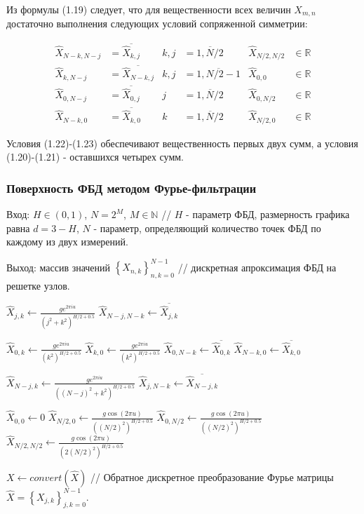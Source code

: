 Из формулы (1.19) следует, что для вещественности всех величин $X_{m,n}$ достаточно выполнения следующих условий сопряженной симметрии:

\begin{align}
	\hat{X}_{N-k,N-j} &= \overline{\hat{X}_{k,j}} &k,j &= \overline{1,N/2} &\hat{X}_{N/2,N/2} & \in \mathbb{R}\\
	\hat{X}_{k,N-j} &= \overline{\hat{X}_{N-k,j}} &k,j &= \overline{1,N/2-1} &\hat{X}_{0,0} & \in \mathbb{R}\\
	\hat{X}_{0,N-j} &= \overline{\hat{X}_{0,j}} &j &= \overline{1,N/2} &\hat{X}_{0,N/2} & \in \mathbb{R}\\
	\hat{X}_{N-k,0} &= \overline{\hat{X}_{k,0}} &k &= \overline{1,N/2} &\hat{X}_{N/2,0} & \in \mathbb{R}
\end{align}

Условия (1.22)-(1.23) обеспечивают вещественность первых двух сумм, а условия (1.20)-(1.21) - оставшихся четырех сумм.

\subsubsection{Поверхность ФБД методом Фурье-фильтрации}

Вход: $H \in (0,1)$, $N=2^M$, $M \in \mathbb{N}$ // $H$ - параметр ФБД, размерность графика равна $d = 3 - H$, $N$ - параметр, определяющий количество точек ФБД по каждому из двух измерений.

Выход: массив значений $\left\{X_{n,k}\right\}_{n,k=0}^{N-1}$ // дискретная апроксимация ФБД на решетке узлов.

\begin{algorithmic}[1]
	\State $\hat{X}_{j,k} \gets \frac{ge^{2\pi iu}}{(j^2+k^2)^{H/2+0.5}}$
	\State$\hat{X}_{N-j,N-k} \gets \overline{\hat{X}_{j,k}}$
	\EndFor
	
	\State $\hat{X}_{0,k} \gets \frac{ge^{2\pi iu}}{(k^2)^{H/2+0.5}}$
	\State $\hat{X}_{k,0} \gets \frac{ge^{2\pi iu}}{(k^2)^{H/2+0.5}}$
	\State $\hat{X}_{0,N-k} \gets \overline{\hat{X}_{0,k}}$
	\State $\hat{X}_{N-k,0} \gets \overline{\hat{X}_{k,0}}$
	\EndFor
	
	\State $\hat{X}_{N-j,k} \gets \frac{ge^{2\pi iu}}{((N-j)^2+k^2)^{H/2+0.5}}$
	\State $\hat{X}_{j,N-k} \gets \overline{\hat{X}_{N-j,k}}$
	\EndFor
	
	\State $\hat{X}_{0,0} \gets 0$
	\State $\hat{X}_{N/2,0} \gets \frac{g\cos (2\pi u)}{((N/2)^2)^{H/2+0.5}}$
	\State $\hat{X}_{0,N/2} \gets \frac{g\cos (2\pi u)}{((N/2)^2)^{H/2+0.5}}$
	\State $\hat{X}_{N/2,N/2} \gets \frac{g\cos (2\pi u)}{(2(N/2)^2)^{H/2+0.5}}$
	
	\State $X \gets convert(\hat{X})$ // Обратное дискретное преобразование Фурье матрицы $\hat{X} = \left\{X_{j,k}\right\}_{j,k=0}^{N-1}$.
\end{algorithmic}

